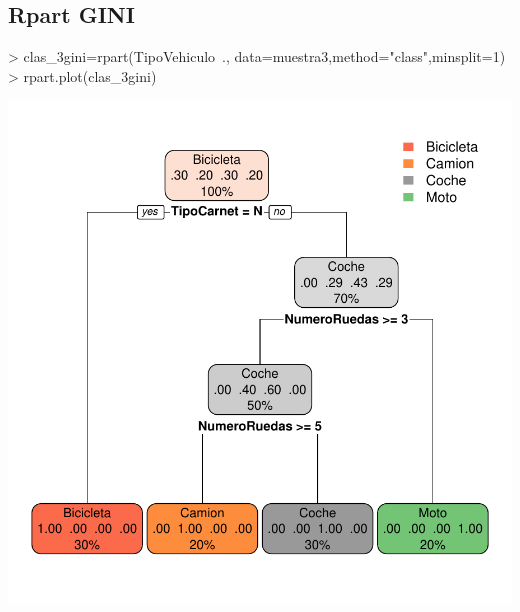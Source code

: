 \documentclass [a4paper] {article}
\begin{document}
\subsection{Rpart GINI}
\begin{center}
\begin{Schunk}
\begin{Sinput}
> clas_3gini=rpart(TipoVehiculo~., data=muestra3,method="class",minsplit=1)
> rpart.plot(clas_3gini)
\end{Sinput}
\end{Schunk}
\includegraphics{entrega-rpart3_gini}
\end{center}

\newpage
\end{document}
